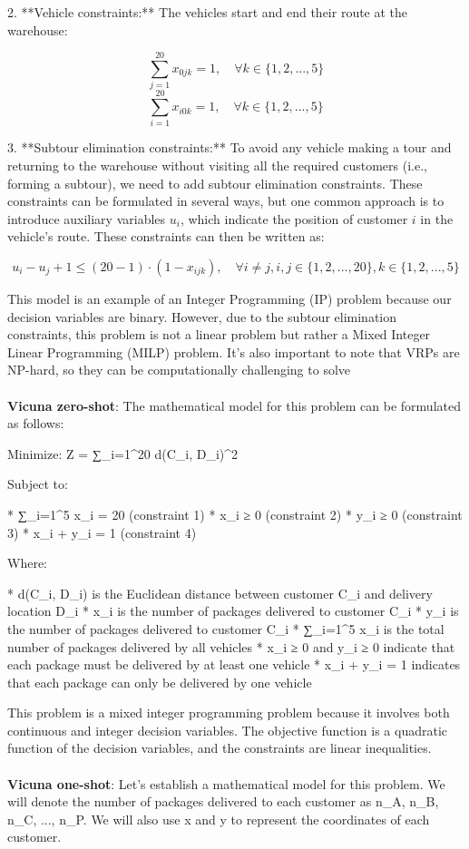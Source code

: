 \documentclass{article}%
\begin{document}
2. **Vehicle constraints:** The vehicles start and end their route at the warehouse:

    $$\sum_{j=1}^{20} x_{0jk} = 1, \quad \forall k \in \{1, 2, ..., 5\}$$
    $$\sum_{i=1}^{20} x_{i0k} = 1, \quad \forall k \in \{1, 2, ..., 5\}$$

3. **Subtour elimination constraints:** To avoid any vehicle making a tour and returning to the warehouse without visiting all the required customers (i.e., forming a subtour), we need to add subtour elimination constraints. These constraints can be formulated in several ways, but one common approach is to introduce auxiliary variables $u_i$, which indicate the position of customer $i$ in the vehicle's route. These constraints can then be written as:

    $$u_i - u_j + 1 \le (20 - 1) \cdot (1 - x_{ijk}), \quad \forall i \ne j, i, j \in \{1, 2, ..., 20\}, k \in \{1, 2, ..., 5\}$$

This model is an example of an Integer Programming (IP) problem because our decision variables are binary. However, due to the subtour elimination constraints, this problem is not a linear problem but rather a Mixed Integer Linear Programming (MILP) problem. It's also important to note that VRPs are NP-hard, so they can be computationally challenging to solve\\\\%
\textbf{Vicuna zero-shot}: The mathematical model for this problem can be formulated as follows:

Minimize: Z = ∑\_{i=1}^{20} d(C\_i, D\_i)^2

Subject to:

* ∑\_{i=1}^{5} x\_i = 20 (constraint 1)
* x\_i ≥ 0 (constraint 2)
* y\_i ≥ 0 (constraint 3)
* x\_i + y\_i = 1 (constraint 4)

Where:

* d(C\_i, D\_i) is the Euclidean distance between customer C\_i and delivery location D\_i
* x\_i is the number of packages delivered to customer C\_i
* y\_i is the number of packages delivered to customer C\_i
* ∑\_{i=1}^{5} x\_i is the total number of packages delivered by all vehicles
* x\_i ≥ 0 and y\_i ≥ 0 indicate that each package must be delivered by at least one vehicle
* x\_i + y\_i = 1 indicates that each package can only be delivered by one vehicle

This problem is a mixed integer programming problem because it involves both continuous and integer decision variables. The objective function is a quadratic function of the decision variables, and the constraints are linear inequalities.\\\\%
\textbf{Vicuna one-shot}: Let's establish a mathematical model for this problem. We will denote the number of packages delivered to each customer as n\_A, n\_B, n\_C, ..., n\_P. We will also use x and y to represent the coordinates of each customer.
\end{document}
